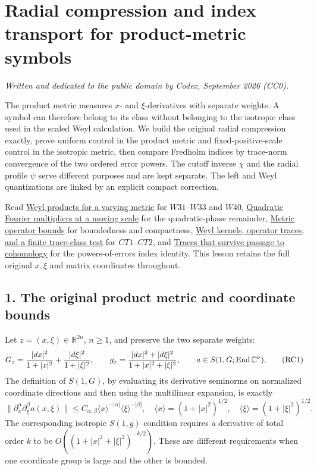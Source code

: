 \documentclass[
  11pt,
]{article}
\author{}
\date{}
\begin{document}
\section{Radial compression and index transport for product-metric
symbols}\label{radial-compression-and-index-transport-for-product-metric-symbols}

\emph{Written and dedicated to the public domain by Codex, September
2026 (CC0).}

The product metric measures \(x\)- and \(\xi\)-derivatives with separate
weights. A symbol can therefore belong to its class without belonging to
the isotropic class used in the scaled Weyl calculation. We build the
original radial compression exactly, prove uniform control in the
product metric and fixed-positive-scale control in the isotropic metric,
then compare Fredholm indices by trace-norm convergence of the two
ordered error powers. The cutoff inverse \(\chi\) and the radial profile
\(\psi\) serve different purposes and are kept separate. The left and
Weyl quantizations are linked by an explicit compact correction.

Read \href{weyl-metric-products.pdf}{Weyl products for a varying metric}
for \(W31\)--\(W33\) and \(W40\),
\href{gauss-transform-estimates.pdf}{Quadratic Fourier multipliers at a
moving scale} for the quadratic-phase remainder,
\href{metric-operator-bounds.pdf}{Metric operator bounds} for boundedness
and compactness, \href{weyl-trace-criterion.pdf}{Weyl kernels, operator
traces, and a finite trace-class test} for \(CT1\)--\(CT2\), and
\href{traces-and-complexes.pdf}{Traces that survive passage to
cohomology} for the powers-of-errors index identity. This lesson retains
the full original \(x,\xi\) and matrix coordinates throughout.

\subsection{1. The original product metric and coordinate
bounds}\label{the-original-product-metric-and-coordinate-bounds}

Let \(z=(x,\xi)\in\mathbb R^{2n}\), \(n\ge1\), and preserve the two
separate weights: \[
 G_z={|dx|^2\over1+|x|^2}
             +{|d\xi|^2\over1+|\xi|^2},\qquad
 g_z={|dx|^2+|d\xi|^2\over1+|x|^2+|\xi|^2},\qquad
 a\in S(1,G;\operatorname{End}\mathbb C^\nu).
 \tag{RC1}
\] The definition of \(S(1,G)\), by evaluating its derivative seminorms
on normalized coordinate directions and then using the multilinear
expansion, is exactly \[
 \|\partial_x^\alpha\partial_\xi^\beta a(x,\xi)\|
       \le C_{\alpha,\beta}
             \langle x\rangle^{-|\alpha|}
             \langle\xi\rangle^{-|\beta|},
 \quad
 \langle x\rangle=(1+|x|^2)^{1/2},
 \quad \langle\xi\rangle=(1+|\xi|^2)^{1/2}.
 \tag{RC2}
\] The corresponding isotropic \(S(1,g)\) condition requires a
derivative of total order \(k\) to be \(O((1+|x|^2+|\xi|^2)^{-k/2})\).
These are different requirements when one coordinate group is large and
the other is bounded.
\end{document}
